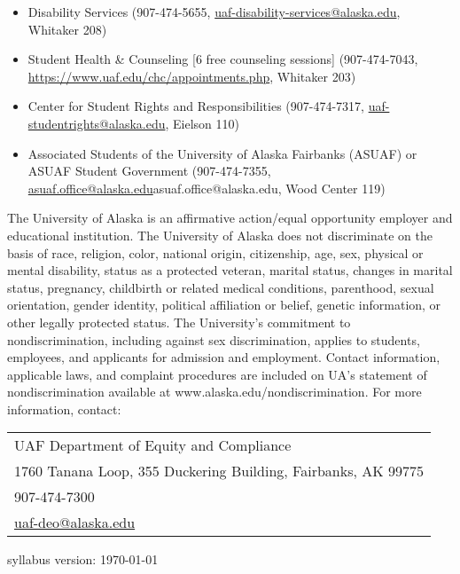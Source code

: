 \documentclass[12pt]{article}
\def\mailto#1{\href{mailto:#1}{#1}}
\begin{document}
\begin{itemize}
\setlength\itemsep{0em}
\item Disability Services (907-474-5655, \mailto{uaf-disability-services@alaska.edu}, Whitaker 208)
\item Student Health \& Counseling [6 free counseling sessions] (907-474-7043, \url{https://www.uaf.edu/chc/appointments.php}, Whitaker 203)
\item Center for Student Rights and Responsibilities (907-474-7317, \mailto{uaf-studentrights@alaska.edu}, Eielson 110)
\item Associated Students of the University of Alaska Fairbanks (ASUAF) or ASUAF Student Government (907-474-7355, \mailto{asuaf.office@alaska.edu}{asuaf.office@alaska.edu}, Wood Center 119)
\end{itemize}

The University of Alaska is an affirmative action/equal opportunity employer and educational institution. The University of Alaska does not discriminate on the basis of race, religion, color, national origin, citizenship, age, sex, physical or mental disability, status as a protected veteran, marital status, changes in marital status, pregnancy, childbirth or related medical conditions, parenthood, sexual orientation, gender identity, political affiliation or belief, genetic information, or other legally protected status. The University's commitment to nondiscrimination, including against sex discrimination, applies to students, employees, and applicants for admission and employment. Contact information, applicable laws, and complaint procedures are included on UA's statement of nondiscrimination available at www.alaska.edu/nondiscrimination. For more information, contact:

\begin{tabular}{l}
UAF Department of Equity and Compliance\\
1760 Tanana Loop, 355 Duckering Building, Fairbanks, AK  99775\\
907-474-7300\\
\mailto{uaf-deo@alaska.edu}
\end{tabular}

 \scriptsize syllabus version: \today \normalsize
\end{document}
